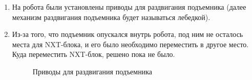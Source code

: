 \begin{enumerate}
\begin{enumerate}
      \item	На робота были установлены приводы для раздвигания подъемника (далее механизм раздвигания подъемника будет называться лебедкой).
      
      \item	Из-за того, что подъемник опускался внутрь робота, под ним не осталось места для NXT-блока, и его было необходимо переместить в другое место. Куда переместить NXT-блок, решено пока не было.
      
      \begin{figure}[H]
      	\begin{minipage}[h]{1\linewidth}
      		\caption{Приводы для раздвигания подъемника}
      	\end{minipage}
      \end{figure}
      

\end{enumerate}
\end{enumerate}
